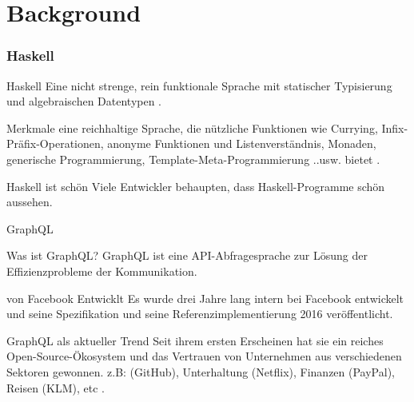 
\section{Background}

\begin{frame}\frametitle{Haskell}

    \footnotesize
    \begin{block}{Haskell}
        Eine \alert{nicht strenge}, \alert{rein funktionale} Sprache mit statischer 
        Typisierung und algebraischen Datentypen \cite{history-of-haskell}.
    \end{block}

    \begin{block}{Merkmale}
        eine reichhaltige Sprache, die nützliche Funktionen wie 
        Currying, Infix-Präfix-Operationen, anonyme Funktionen und
        Listenverständnis, Monaden, 
        generische Programmierung, 
        Template-Meta-Programmierung 
        ..usw. bietet \cite{history-of-haskell}.
    \end{block}

    \begin{block}{Haskell ist schön}
        Viele Entwickler behaupten, dass Haskell-Programme schön aussehen. 
        \cite{history-of-haskell} 
    \end{block}

\end{frame}

\begin{frame}{GraphQL}

    \footnotesize

    \begin{block}{Was ist GraphQL?}
        GraphQL ist eine API-Abfragesprache zur Lösung der Effizienzprobleme der Kommunikation\cite{gql-iot}.         
    \end{block}

    \begin{block}{von Facebook Entwicklt}
        Es wurde drei Jahre lang intern bei Facebook entwickelt und seine Spezifikation und seine Referenzimplementierung 2016 veröffentlicht.
        \cite{initial-analysis-of-gql}
    \end{block}

    \begin{block}{GraphQL als aktueller Trend}
        Seit ihrem ersten Erscheinen hat sie ein reiches Open-Source-Ökosystem und das Vertrauen von Unternehmen aus verschiedenen Sektoren gewonnen. z.B: (GitHub), Unterhaltung (Netflix), Finanzen (PayPal), Reisen (KLM), etc \cite{morph-gql-1,gql-healthcare}.
    \end{block}

\end{frame}


